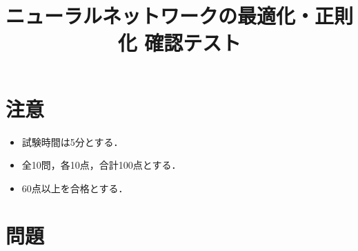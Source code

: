\documentclass[uplatex,a4paper,12pt]{jsarticle}
\begin{document}
\title{ニューラルネットワークの最適化・正則化 確認テスト}
\author{}
\date{}
\maketitle

\section*{注意}
\begin{itemize}
\item 試験時間は5分とする．
\item 全10問，各10点，合計100点とする．
\item 60点以上を合格とする．
\end{itemize}

\section*{問題}
\end{document}

